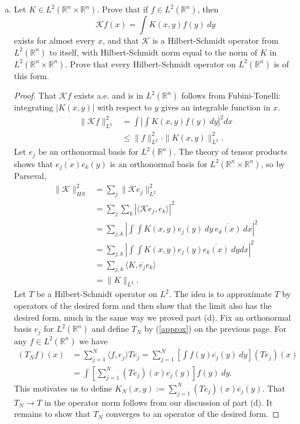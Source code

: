 \documentclass[11pt,letterpaper]{report}
\newcommand{\reals}{\mathbb{R}}
\newcommand{\mcal}[1]{\mathcal{#1}}
\begin{document}
\begin{enumerate}[(a)]
	\item Let $K\in L^2(\reals^n\times \reals^n)$. Prove that if $f\in L^2(\reals^n)$, then
	\[
	\mcal{K}f(x) = \int K(x,y)f(y)\ dy
	\]
	exists for almost every $x$, and that $\mcal{K}$ is a Hilbert-Schmidt operator from $L^2(\reals^n)$ to itself, with Hilbert-Schmidt norm equal to the norm of $K$ in $L^2(\reals^n\times \reals^n)$. Prove that every Hilbert-Schmidt operator on $L^2(\reals^n)$ is of this form.
	\begin{proof}
		That $\mcal{K}f$ exists a.e. and is in $L^2(\reals^n)$ follows from Fubini-Tonelli: integrating $|K(x,y)|$ with respect to $y$ gives an integrable function in $x$.
		\begin{align*}
			\|\mcal{K}f\|_{L^2}^2 &= \int\left|\int K(x,y)f(y)\ dy\right|^2dx\\
			&\leq \|f\|_{L^2}^2\cdot \|K(x,y)\|_{L^2}^2.
		\end{align*}
		Let $e_j$ be an orthonormal basis for $L^2(\reals^n)$. The theory of tensor products shows that $\overline{e_j(x)}e_k(y)$ is an orthonormal basis for $L^2(\reals^n\times \reals^n)$, so by Parseval,
		\begin{align*}
			\|\mcal{K}\|_{HS}^2 &= \sum_j\|\mcal{K}e_j\|_{L^2}^2\\
			&= \sum_j\sum_k|\langle \mcal{K}e_j, e_k\rangle|^2\\
			&= \sum_{j,k}\left|\int\int K(x,y)e_j(y)\ dy\ \overline{e_k(x)}\ dx\right|^2\\
			&= \sum_{j,k}\left|\int\int K(x,y)e_j(y)\overline{e_k(x)}\ dydx\right|^2\\
			&= \sum_{j,k}\langle K, \overline{e_j}e_k\rangle\\
			&= \|K\|_{L^2}.
		\end{align*}
		Let $T$ be a Hilbert-Schmidt operator on $L^2$. The idea is to approximate $T$ by operators of the desired form and then show that the limit also has the desired form, much in the same way we proved part (d). Fix an orthonormal basis $e_j$ for $L^2(\reals^n)$ and define $T_N$ by (\ref{approx}) on the previous page. For any $f\in L^2(\reals^n)$ we have
		\begin{align*}
			(T_Nf)(x) &= \sum_{j=1}^N\langle f, e_j\rangle Te_j
			= \sum_{j=1}^N\left[\int f(y)\overline{e_j}(y)\ dy\right](Te_j)(x)\\
			&= \int\left[\sum_{j=1}^N(Te_j)(x)\overline{e_j}(y)\right]f(y)\ dy.
		\end{align*}
		This motivates us to define $K_N(x,y) := \sum_{j=1}^N(Te_j)(x)\overline{e_j}(y)$. That $T_N\to T$ in the operator norm follows from our discussion of part (d). It remains to show that $T_N$ converges to an operator of the desired form.   
	\end{proof}
\end{enumerate}
\end{document}
